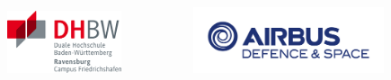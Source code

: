 \thispagestyle{empty}

\singlespacing


\begin{figure}[t]
 \centering
 \includegraphics[width=0.3\textwidth]{img/DHBW-Logo}
 ~~~~~~~~~~
 \includegraphics[width=0.5\textwidth]{img/AIRBUS-Logo}
\end{figure}


\begin{verbatim}

\end{verbatim}

